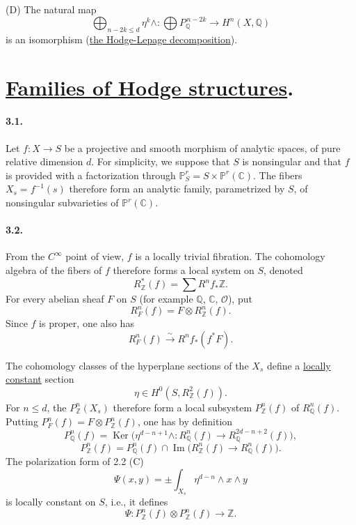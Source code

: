 \documentclass[10pt,leqno]{article}
\newcommand{\C}{\mathbb C}
\newcommand{\Z}{\mathbb Z}
\newcommand{\Q}{\mathbb Q}
\newcommand{\Pj}{\mathbb P}
\newcommand{\cO}{\mathcal O}
\newcommand{\Ker}{\operatorname{Ker}}
\newcommand{\Imop}{\operatorname{Im}}
\theoremstyle{deligne}
\renewcommand{\underline}[1]{\uline{#1}}
\begin{document}
(D) The natural map
\[
\bigoplus_{n-2k\le d}\eta^k\wedge:
\bigoplus P_\Q^{\,n-2k}\longrightarrow H^n(X,\Q)
\]
is an isomorphism (\underline{the Hodge-Lepage decomposition}).

\section{\underline{Families of Hodge structures}.}

\paragraph{3.1.}
Let $f:X\to S$ be a projective and smooth morphism of analytic spaces, of pure relative dimension $d$. For simplicity, we suppose that $S$ is nonsingular and that $f$ is provided with a factorization through $\Pj^r_S=S\times\Pj^r(\C)$. The fibers $X_s=f^{-1}(s)$ therefore form an analytic family, parametrized by $S$, of nonsingular subvarieties of $\Pj^r(\C)$.

\paragraph{3.2.}
From the $C^\infty$ point of view, $f$ is a locally trivial fibration. The cohomology algebra of the fibers of $f$ therefore forms a local system on $S$, denoted
\[
R_\Z^*(f)=\sum R^n f_*\Z .
\]
For every abelian sheaf $F$ on $S$ (for example $\Q$, $\C$, $\cO$), put
\begin{equation}
R_F^n(f)=F\otimes R_\Z^n(f).
\tag{3.2.1}
\end{equation}
Since $f$ is proper, one also has
\[
R_F^n(f)\xrightarrow{\sim} R^n f_*(f^*F).
\]

The cohomology classes of the hyperplane sections of the $X_s$ define a \underline{locally constant} section
\begin{equation}
\eta\in H^0(S,R_\Z^2(f)).
\tag{3.2.2}
\end{equation}
For $n\le d$, the $P_\Z^n(X_s)$ therefore form a local subsystem $P_\Z^n(f)$ of $R_\Q^n(f)$. Putting $P_F^n(f)=F\otimes P_\Z^n(f)$, one has by definition
\begin{equation}
P_\Q^n(f)=\Ker\bigl(\eta^{d-n+1}\wedge:R_\Q^n(f)\to R_\Q^{2d-n+2}(f)\bigr),
\tag{3.2.3}
\end{equation}
\begin{equation}
P_\Z^n(f)=P_\Q^n(f)\cap \Imop\bigl(R_\Z^n(f)\to R_\Q^n(f)\bigr).
\tag{3.2.4}
\end{equation}
The polarization form of 2.2 (C)
\begin{equation}
\Psi(x,y)=\pm\int_{X_s}\eta^{d-n}\wedge x\wedge y
\tag{3.2.5}
\end{equation}
is locally constant on $S$, i.e., it defines
\begin{equation}
\Psi:P_\Z^n(f)\otimes P_\Z^n(f)\longrightarrow \Z .
\tag{3.2.6}
\end{equation}
\end{document}
